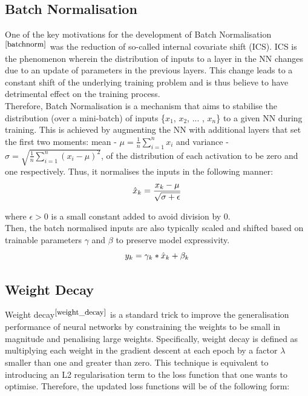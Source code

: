 \subsection{Batch Normalisation}


One of the key motivations for the development of Batch Normalisation$^{\small \cite{batchnorm}}$ was the reduction of so-called internal covariate shift (ICS). ICS is the phenomenon wherein the distribution of inputs to a layer in the NN changes due to an update of parameters in the previous layers. This change leads to a constant shift of the underlying training problem and is thus believe to have detrimental effect on the training process. \\

Therefore, Batch Normalisation is a mechanism that aims to stabilise the distribution (over a mini-batch) of inputs \{$x_1$, $x_2$, ... , $x_n$\} to a given NN during training. This is achieved by augmenting the NN with additional layers that set the first two moments: mean - $\mu = \frac{1}{n} \sum_{i=1}^n x_i$ and variance - $\sigma = \sqrt{\frac{1}{n} \sum_{i=1}^n (x_i - \mu) ^ 2}$, of the distribution of each activation to be zero and one respectively. Thus, it normalises the inputs in the following manner: \\

\begin{equation}
  \centering
  \hat{x}_k = \frac{x_k - \mu}{\sqrt{\sigma + \epsilon}}
\end{equation}

where $\epsilon > 0$ is a small constant added to avoid division by 0. \\

Then, the batch normalised inputs are also typically scaled and shifted based on trainable parameters $\gamma$ and $\beta$ to preserve model expressivity. \\

\begin{equation}
  \centering
  y_k = \gamma_k * \hat{x}_k + \beta_k
\end{equation}

\subsection{Weight Decay}
Weight decay$^{\small \cite{weight_decay}}$ is a standard trick to improve the generalisation performance of neural
networks by constraining the weights to be small in magnitude and penalising large weights. Specifically, weight decay is defined as multiplying each weight in the gradient descent at each epoch by a factor $\lambda$ smaller than one and greater than zero. This technique is equivalent to introducing an L2 regularisation term to the loss function that one wants to optimise. Therefore, the updated loss functions will be of the following form: \\

